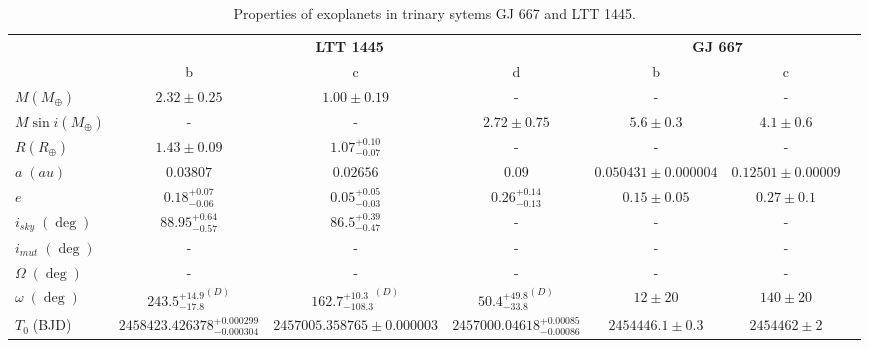 \documentclass[referee]{aa}
\begin{document}
    \begin{table}[t]
        \centering
        \small
        \caption{Properties of exoplanets in trinary sytems GJ 667 and LTT 1445.}
        \label{tab:planets}
        \begin{tabular}{lcccccc}
                \toprule
                \textbf{} &
                \multicolumn{3}{c}{\textbf{LTT 1445}} &
                \multicolumn{2}{c}{\textbf{GJ 667}} \\
                \cmidrule(lr){2-4}
                \cmidrule(lr){5-6} 
                & b & c & d &
                b & c & \\
                \midrule
                $M (M_\oplus)$ & $2.32 \pm 0.25$ & $1.00 \pm 0.19$ & - & - & - &\\
                $M \sin i (M_\oplus)$ & - & - & $2.72 \pm 0.75$ & $5.6 \pm 0.3$ & $4.1 \pm 0.6$ &\\
                $R (R_\oplus)$  & $1.43 \pm 0.09$ & ${1.07^{+0.10}_{-0.07}}$ & - & - & - &\\
                $a \; (au)$  & $0.03807$ & $0.02656$ & $0.09$ & $0.050431 \pm 0.000004$ & $0.12501 \pm 0.00009$ &\\
                $e $  & ${0.18^{+0.07}_{-0.06}}$ & ${0.05^{+0.05}_{-0.03}}$ &  ${0.26^{+0.14}_{-0.13}}$& $0.15 \pm 0.05$ & $0.27 \pm 0.1$ &\\
                $i_{sky} \; (\deg)$  & $88.95^{+0.64}_{-0.57}$ & ${86.5^{+0.39}_{-0.47}}$ & - & - & - &\\
                $i_{mut} \; (\deg)$  & - & - & - & - & - &\\
                $\Omega \; (\deg) $  & - & - & - & - & - & \\
                $\omega \; (\deg) $  & ${243.5^{+14.9}_{-17.8}}^{(D)}$ & ${162.7^{+10.3}_{-108.3}}^{(D)}$ & ${50.4^{+49.8}_{-33.8}}^{(D)}$ & $12 \pm 20$ & $140 \pm 20$ &\\
                $T_0 \;$(BJD)  & ${2458423.426378^{+0.000299}_{-0.000304}}$ & ${2457005.358765 \pm 0.000003}$ & ${2457000.04618^{+0.00085}_{-0.00086}}$ & $2454446.1 \pm 0.3$ & $2454462 \pm 2$ & \\
                \bottomrule
        \end{tabular}

    \end{table}
\end{document}
